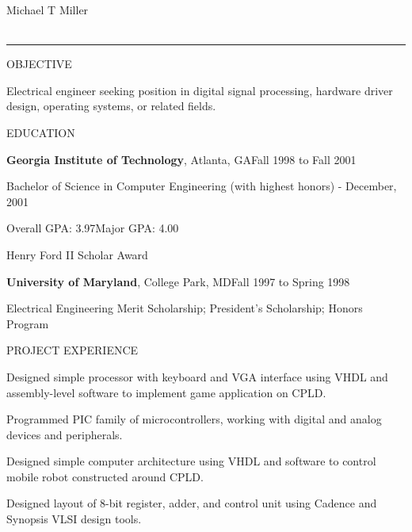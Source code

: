 \documentclass[letterpaper,10pt]{article}
\newenvironment{narrowitemize}{
    \begin{list}{\textbullet{}}{%
        \setlength{\topsep}{0pt}%
        \setlength{\itemsep}{0pt}%
        \setlength{\parsep}{0pt}%
    }
}{\end{list}}
\begin{document}
\begin{center}
    {\Large Michael T Miller} \\
     \hspace{\parindent}  \hspace{\parindent}  \\
    
    \rule[4pt]{\columnwidth}{0.5pt}
\end{center}

\noindent OBJECTIVE

\addtolength{\columnwidth}{-\parindent}

\parbox[t]{\columnwidth}{Electrical engineer seeking position in
digital signal processing, hardware driver design, operating systems,
or related fields.}

\bigskip

\noindent EDUCATION

\textbf{Georgia Institute of Technology}, Atlanta, GA\hfill{}Fall 1998
to Fall 2001

Bachelor of Science in Computer Engineering (with highest honors) -
December, 2001

Overall GPA: 3.97\hspace{\parindent}Major GPA: 4.00

\hspace{\parindent}Henry Ford II Scholar Award

\medskip

\textbf{University of Maryland}, College Park, MD\hfill{}Fall 1997 to
Spring 1998

\hspace{\parindent}Electrical Engineering Merit Scholarship;
President's Scholarship; Honors Program

\bigskip

\noindent PROJECT EXPERIENCE

\begin{narrowitemize}

    \item Designed simple processor with keyboard and VGA interface
          using VHDL and assembly-level software to implement game
          application on CPLD.

    \item Programmed PIC family of microcontrollers, working with
          digital and analog devices and peripherals.

    \item Designed simple computer architecture using VHDL and
          software to control mobile robot constructed around CPLD.

    \item Designed layout of 8-bit register, adder, and control unit
          using Cadence and Synopsis VLSI design tools.

\end{narrowitemize}
\end{document}
